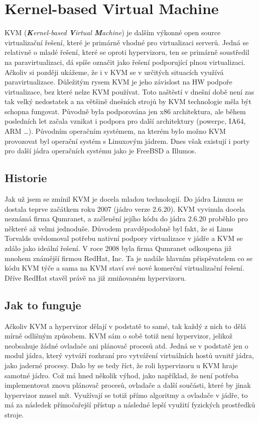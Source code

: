 \section{Kernel-based Virtual Machine}
KVM (\emph{\textbf{K}ernel-based \textbf{V}irtual \textbf{M}achine}) je dalším výkonné open source virtualizační řešení, které je primárně vhodné pro virtualizaci serverů. Jedná se relativně o mladé řešení, které se oproti \xen hypervizoru, ten se primárně soustředil na paravirtualizaci, dá spíše označit jako řešení podporující plnou virtualizaci. Ačkoliv si později ukážeme, že i v KVM se v určitých situacích využívá paravirtualizace. Důležitým rysem KVM je jeho závislost na HW podpoře virtualizace, bez které nelze KVM používat. Toto naštěstí v dnešní době není zas tak velký nedostatek a na většině dnešních strojů by KVM technologie měla být schopna fungovat. Původně byla podporována jen x86 architektura, ale během posledních let začala vznikat i podpora pro další architektury (powerpc, IA64, ARM \dots). Původním operačním systémem, na kterém bylo možno KVM provozovat byl operační systém s Linuxovým jádrem. Dnes však existují i porty pro další jádra operačních systému jako je FreeBSD a Illumos.

\subsection{Historie}
Jak už jsem se zmínil KVM je docela mladou technologií. Do jádra Linuxu se dostala teprve začátkem roku 2007 (jádro verze 2.6.20). KVM vyvinula docela neznámá firma Qumranet, a začlenění jejího kódu do jádra 2.6.20 proběhlo pro některé až velmi jednoduše. Důvodem pravděpodobně byl fakt, že si Linus Torvalds uvědomoval potřebu nativní podpory virtualizace v jádře a KVM se zdálo jako ideální řešení. V roce 2008 byla firma Qumranet odkoupena již mnohem známější firmou RedHat, Inc. Ta je nadále hlavním přispěvatelem co se kódu KVM týče a sama na KVM staví své nové komerční virtualizační řešení. Dříve RedHat stavěl právě na již zmiňovaném \xen hypervizoru. 

\subsection{Jak to funguje}
Ačkoliv KVM a \xen hypervizor dělají v podstatě to samé, tak každý z nich to dělá mírně odlišným způsobem. KVM sám o sobě totiž není hypervizor, jelikož neobsahuje žádné ovladače ani plánovač procesů atd. Jedná se v podstatě jen o modul jádra, který vytváří rozhraní pro vytváření virtuálních hostů uvnitř jádra, jako jaderné procesy. Dalo by se tedy říct, že roli hypervizoru u KVM hraje samotné jádro. Což má hned několik výhod, jako například, že není potřeba implementovat znovu plánovač procesů, ovladače a další součásti, které by jinak hypervizor musel mít. Využívají se totiž přímo algoritmy a ovladače v jádře, to má za následek přímočařejší přístup a následné lepší využití fyzických prostředků stroje.

